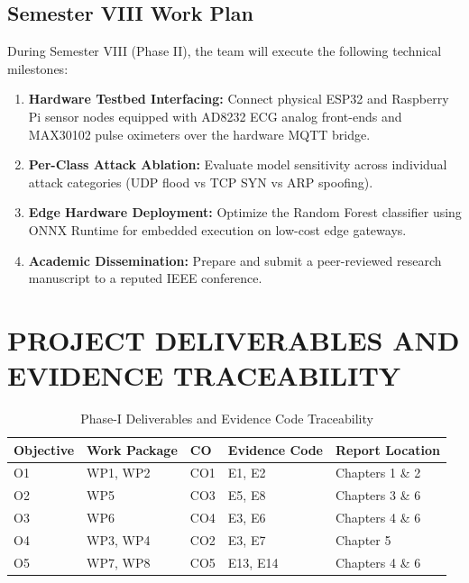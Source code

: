 \documentclass[12pt,a4paper]{report}
\begin{document}
\section{Semester VIII Work Plan}
During Semester VIII (Phase II), the team will execute the following technical milestones:
\begin{enumerate}
    \item \textbf{Hardware Testbed Interfacing:} Connect physical ESP32 and Raspberry Pi sensor nodes equipped with AD8232 ECG analog front-ends and MAX30102 pulse oximeters over the hardware MQTT bridge.
    \item \textbf{Per-Class Attack Ablation:} Evaluate model sensitivity across individual attack categories (UDP flood vs TCP SYN vs ARP spoofing).
    \item \textbf{Edge Hardware Deployment:} Optimize the Random Forest classifier using ONNX Runtime for embedded execution on low-cost edge gateways.
    \item \textbf{Academic Dissemination:} Prepare and submit a peer-reviewed research manuscript to a reputed IEEE conference.
\end{enumerate}

\appendix

\chapter{PROJECT DELIVERABLES AND EVIDENCE TRACEABILITY}
\begin{table}[h]
\centering
\caption{Phase-I Deliverables and Evidence Code Traceability}
\label{tab:app_a}
\vspace{0.3cm}
\begin{tabular}{|l|l|l|l|l|}
\hline
\textbf{Objective} & \textbf{Work Package} & \textbf{CO} & \textbf{Evidence Code} & \textbf{Report Location} \\
\hline
O1 & WP1, WP2 & CO1 & E1, E2 & Chapters 1 \& 2 \\
O2 & WP5 & CO3 & E5, E8 & Chapters 3 \& 6 \\
O3 & WP6 & CO4 & E3, E6 & Chapters 4 \& 6 \\
O4 & WP3, WP4 & CO2 & E3, E7 & Chapter 5 \\
O5 & WP7, WP8 & CO5 & E13, E14 & Chapters 4 \& 6 \\
\hline
\end{tabular}
\end{table}
\end{document}
